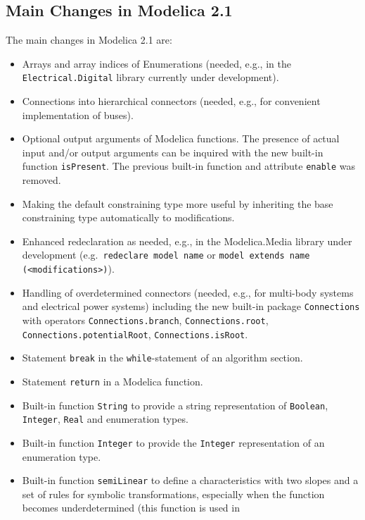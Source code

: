 \subsection{Main Changes in Modelica 2.1}\label{main-changes-in-modelica-2-1}

The main changes in Modelica 2.1 are:
\begin{itemize}
\item
  Arrays and array indices of Enumerations (needed, e.g., in the
  \lstinline!Electrical.Digital! library currently under development).
\item
  Connections into hierarchical connectors (needed, e.g., for convenient
  implementation of buses).
\item
  Optional output arguments of Modelica functions. The presence of
  actual input and/or output arguments can be inquired with the new
  built-in function \lstinline!isPresent!. The previous built-in function and
  attribute \lstinline!enable! was removed.
\item
  Making the default constraining type more useful by inheriting the
  base constraining type automatically to modifications.
\item
  Enhanced redeclaration as needed, e.g., in the Modelica.Media library
  under development (e.g.\ \lstinline!redeclare model name! or \lstinline!model extends name (<modifications>)!).
\item
  Handling of overdetermined connectors (needed, e.g., for multi-body
  systems and electrical power systems) including the new built-in
  package \lstinline!Connections! with operators \lstinline!Connections.branch!,
  \lstinline!Connections.root!, \lstinline!Connections.potentialRoot!, \lstinline!Connections.isRoot!.
\item
  Statement \lstinline!break! in the \lstinline!while!-statement of an algorithm section.
\item
  Statement \lstinline!return! in a Modelica function.
\item
  Built-in function \lstinline!String! to provide a string representation of \lstinline!Boolean!, \lstinline!Integer!, \lstinline!Real! and enumeration types.
\item
  Built-in function \lstinline!Integer! to provide the \lstinline!Integer! representation of an enumeration type.
\item
  Built-in function \lstinline!semiLinear! to define a characteristics with two
  slopes and a set of rules for symbolic transformations, especially
  when the function becomes underdetermined (this function is used in

\end{itemize}
